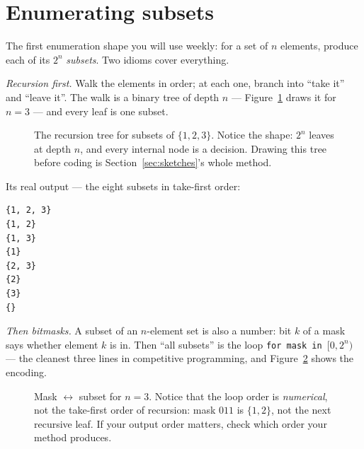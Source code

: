 \section{Enumerating subsets}\label{sec:subsets}

The first enumeration shape you will use weekly: for a set of $n$ elements,
produce each of its $2^n$ \emph{subsets}. Two idioms cover everything.

\emph{Recursion first.} Walk the elements in order; at each one, branch into
``take it'' and ``leave it''. The walk is a binary tree of depth $n$ ---
Figure~\ref{fig:rectree} draws it for $n=3$ --- and every leaf is one subset.

\begin{figure}[ht]\centering

\caption{The recursion tree for subsets of $\{1,2,3\}$. Notice the shape:
$2^n$ leaves at depth $n$, and every internal node is a decision. Drawing
this tree before coding is Section~\ref{sec:sketches}'s whole method.}
\label{fig:rectree}
\end{figure}



Its real output --- the eight subsets in take-first order:

\begin{lstlisting}[numbers=none]
{1, 2, 3}
{1, 2}
{1, 3}
{1}
{2, 3}
{2}
{3}
{}
\end{lstlisting}

\emph{Then bitmasks.} A subset of an $n$-element set is also a
number: bit $k$ of a mask says whether element $k$ is in. Then ``all
subsets'' is the loop \texttt{for mask in $[0, 2^n)$} --- the cleanest three
lines in competitive programming, and Figure~\ref{fig:bitmask} shows the
encoding.

\begin{figure}[ht]\centering

\caption{Mask $\leftrightarrow$ subset for $n=3$. Notice that the loop order
is \emph{numerical}, not the take-first order of recursion: mask $011$ is
$\{1,2\}$, not the next recursive leaf. If your output order matters, check
which order your method produces.}
\label{fig:bitmask}
\end{figure}



